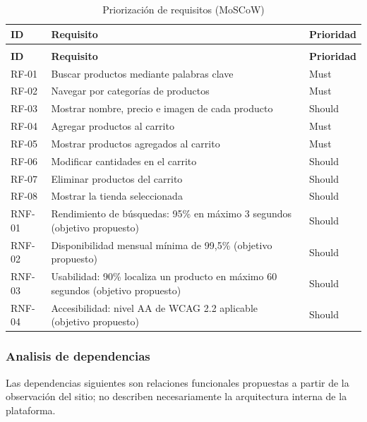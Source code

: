 \documentclass[12pt,a4paper]{article}
\renewcommand{\arraystretch}{1.17}
\begin{document}
\begingroup
\footnotesize
\setlength{\tabcolsep}{3pt}
\renewcommand{\arraystretch}{1.22}
\begin{longtable}{|>{\raggedright\arraybackslash}p{1.65cm}|>{\raggedright\arraybackslash}p{9.25cm}|>{\raggedright\arraybackslash}p{3.1cm}|}
\caption{Priorización de requisitos (MoSCoW)}\\
\hline
\textbf{ID} & \textbf{Requisito} & \textbf{Prioridad} \\
\hline
\endfirsthead
\multicolumn{3}{c}{\textit{Continuación: Priorización de requisitos (MoSCoW)}}\\
\hline
\textbf{ID} & \textbf{Requisito} & \textbf{Prioridad} \\
\hline
\endhead
RF-01 & Buscar productos mediante palabras clave & Must \\
\hline
RF-02 & Navegar por categorías de productos & Must \\
\hline
RF-03 & Mostrar nombre, precio e imagen de cada producto & Should \\
\hline
RF-04 & Agregar productos al carrito & Must \\
\hline
RF-05 & Mostrar productos agregados al carrito & Must \\
\hline
RF-06 & Modificar cantidades en el carrito & Should \\
\hline
RF-07 & Eliminar productos del carrito & Should \\
\hline
RF-08 & Mostrar la tienda seleccionada & Should \\
\hline
RNF-01 & Rendimiento de búsquedas: 95\% en máximo 3 segundos (objetivo propuesto) & Should \\
\hline
RNF-02 & Disponibilidad mensual mínima de 99,5\% (objetivo propuesto) & Should \\
\hline
RNF-03 & Usabilidad: 90\% localiza un producto en máximo 60 segundos (objetivo propuesto) & Should \\
\hline
RNF-04 & Accesibilidad: nivel AA de WCAG 2.2 aplicable (objetivo propuesto) & Should \\
\hline
\end{longtable}
\endgroup

\subsubsection{Analisis de dependencias}
Las dependencias siguientes son relaciones funcionales propuestas a partir de la observación del sitio; no describen necesariamente la arquitectura interna de la plataforma.
\end{document}
